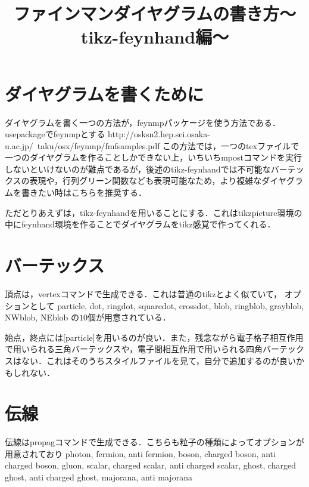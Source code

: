 \documentclass[a4j]{jarticle}
\title{ファインマンダイヤグラムの書き方〜tikz-feynhand編〜}
\begin{document}
\maketitle

\section{ダイヤグラムを書くために}
ダイヤグラムを書く一つの方法が，feynmpパッケージを使う方法である．usepackageでfeynmpとする
http://osksn2.hep.sci.osaka-u.ac.jp/~taku/osx/feynmp/fmfsamples.pdf
この方法では，一つのtexファイルで一つのダイヤグラムを作ることしかできない上，いちいちmpostコマンドを実行しないといけないのが難点であるが，後述のtikz-feynhandでは不可能なバーテックスの表現や，行列グリーン関数なども表現可能なため，より複雑なダイヤグラムを書きたい時はこちらを推奨する．

ただとりあえずは，tikz-feynhandを用いることにする．これはtikzpicture環境の中にfeynhand環境を作ることでダイヤグラムをtikz感覚で作ってくれる．

\section{バーテックス}
頂点は，vertexコマンドで生成できる．これは普通のtikzとよく似ていて，
オプションとして
particle, dot, ringdot, squaredot, crossdot,
blob, ringblob, grayblob, NWblob, NEblob
の$10$個が用意されている．
\begin{figure}[htb]
\centering
{} 
\end{figure}
始点，終点には[particle]を用いるのが良い．また，残念ながら電子格子相互作用で用いられる三角バーテックスや，電子間相互作用で用いられる四角バーテックスはない．これはそのうちスタイルファイルを見て，自分で追加するのが良いかもしれない．

\section{伝線}
伝線はpropagコマンドで生成できる．こちらも粒子の種類によってオプションが用意されており
photon, fermion, anti fermion, boson, charged boson, anti charged
boson, gluon, scalar, charged scalar, anti charged scalar, ghost,
charged ghost, anti charged ghost, majorana, anti majorana
\end{document}
